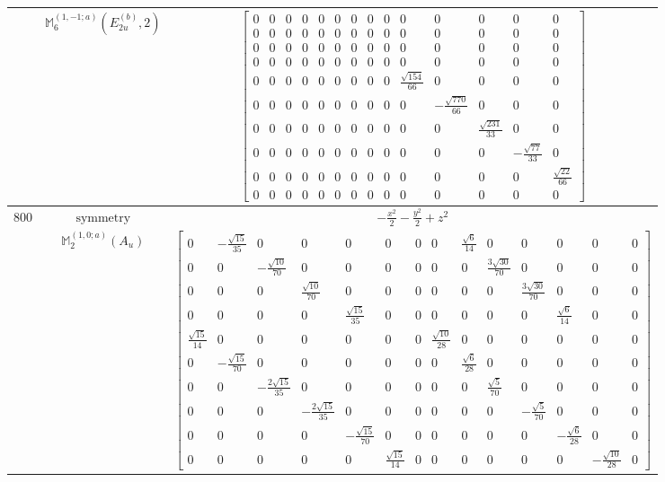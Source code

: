 \documentclass[fleqn,8pt,landscape]{jsarticle}
\begin{document}
\begin{longtable}{ccc}
$  $ & $ \mathbb{M}_{6}^{(1,-1;a)}(E_{2u}^{(b)},2) $ & $ \begin{bmatrix} 0 & 0 & 0 & 0 & 0 & 0 & 0 & 0 & 0 & 0 & 0 & 0 & 0 & 0 \\ 0 & 0 & 0 & 0 & 0 & 0 & 0 & 0 & 0 & 0 & 0 & 0 & 0 & 0 \\ 0 & 0 & 0 & 0 & 0 & 0 & 0 & 0 & 0 & 0 & 0 & 0 & 0 & 0 \\ 0 & 0 & 0 & 0 & 0 & 0 & 0 & 0 & 0 & 0 & 0 & 0 & 0 & 0 \\ 0 & 0 & 0 & 0 & 0 & 0 & 0 & 0 & 0 & \frac{\sqrt{154}}{66} & 0 & 0 & 0 & 0 \\ 0 & 0 & 0 & 0 & 0 & 0 & 0 & 0 & 0 & 0 & - \frac{\sqrt{770}}{66} & 0 & 0 & 0 \\ 0 & 0 & 0 & 0 & 0 & 0 & 0 & 0 & 0 & 0 & 0 & \frac{\sqrt{231}}{33} & 0 & 0 \\ 0 & 0 & 0 & 0 & 0 & 0 & 0 & 0 & 0 & 0 & 0 & 0 & - \frac{\sqrt{77}}{33} & 0 \\ 0 & 0 & 0 & 0 & 0 & 0 & 0 & 0 & 0 & 0 & 0 & 0 & 0 & \frac{\sqrt{22}}{66} \\ 0 & 0 & 0 & 0 & 0 & 0 & 0 & 0 & 0 & 0 & 0 & 0 & 0 & 0 \end{bmatrix} $ \\ \hline
$ 800 $ & $ \text{symmetry} $ & $ - \frac{x^{2}}{2} - \frac{y^{2}}{2} + z^{2} $ \\
$  $ & $ \mathbb{M}_{2}^{(1,0;a)}(A_{u}) $ & $ \begin{bmatrix} 0 & - \frac{\sqrt{15}}{35} & 0 & 0 & 0 & 0 & 0 & 0 & \frac{\sqrt{6}}{14} & 0 & 0 & 0 & 0 & 0 \\ 0 & 0 & - \frac{\sqrt{10}}{70} & 0 & 0 & 0 & 0 & 0 & 0 & \frac{3 \sqrt{30}}{70} & 0 & 0 & 0 & 0 \\ 0 & 0 & 0 & \frac{\sqrt{10}}{70} & 0 & 0 & 0 & 0 & 0 & 0 & \frac{3 \sqrt{30}}{70} & 0 & 0 & 0 \\ 0 & 0 & 0 & 0 & \frac{\sqrt{15}}{35} & 0 & 0 & 0 & 0 & 0 & 0 & \frac{\sqrt{6}}{14} & 0 & 0 \\ \frac{\sqrt{15}}{14} & 0 & 0 & 0 & 0 & 0 & 0 & \frac{\sqrt{10}}{28} & 0 & 0 & 0 & 0 & 0 & 0 \\ 0 & - \frac{\sqrt{15}}{70} & 0 & 0 & 0 & 0 & 0 & 0 & \frac{\sqrt{6}}{28} & 0 & 0 & 0 & 0 & 0 \\ 0 & 0 & - \frac{2 \sqrt{15}}{35} & 0 & 0 & 0 & 0 & 0 & 0 & \frac{\sqrt{5}}{70} & 0 & 0 & 0 & 0 \\ 0 & 0 & 0 & - \frac{2 \sqrt{15}}{35} & 0 & 0 & 0 & 0 & 0 & 0 & - \frac{\sqrt{5}}{70} & 0 & 0 & 0 \\ 0 & 0 & 0 & 0 & - \frac{\sqrt{15}}{70} & 0 & 0 & 0 & 0 & 0 & 0 & - \frac{\sqrt{6}}{28} & 0 & 0 \\ 0 & 0 & 0 & 0 & 0 & \frac{\sqrt{15}}{14} & 0 & 0 & 0 & 0 & 0 & 0 & - \frac{\sqrt{10}}{28} & 0 \end{bmatrix} $ \\ \hline

\end{longtable}
\end{document}
